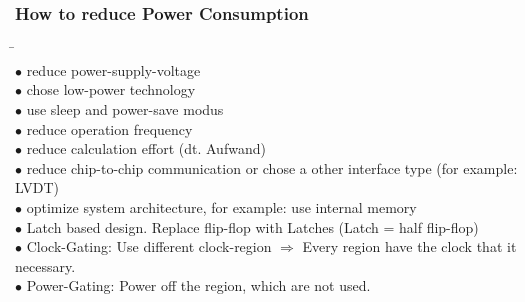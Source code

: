 \subsubsection{How to reduce Power Consumption}
\begin{tabbing}
	\hspace{10mm} \= \hspace{5mm} \= \\
						\>$\bullet$ \>reduce power-supply-voltage \\
						\>$\bullet$ \>chose low-power technology \\
						\>$\bullet$ \>use sleep and power-save modus \\
						\>$\bullet$ \>reduce operation frequency \\
						\>$\bullet$ \>reduce calculation effort (dt. Aufwand)\\
						\>$\bullet$ \>reduce chip-to-chip communication or chose a other interface type (for example: LVDT)  \\
						\>$\bullet$ \>optimize system architecture, for example: use internal memory \\
						\>$\bullet$ \>Latch based design. Replace flip-flop with Latches (Latch = half flip-flop) \\
						\>$\bullet$ \>Clock-Gating: Use different clock-region $\Rightarrow$ Every region have the clock that it necessary. \\
						\>$\bullet$ \>Power-Gating: Power off the region, which are not used. \\				
\end{tabbing}
